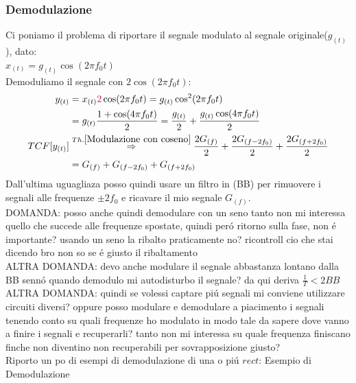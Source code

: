             \subsubsection{Demodulazione}\label{Demodulazione}
            Ci poniamo il problema di riportare il segnale modulato al segnale originale($g_{(t)}$), dato:\\
            $x_{(t)} = g_{(t)} \cos(2\pi f_0t)$\\
            Demoduliamo il segnale con $2\cos(2\pi f_0t)$:
            \begin{align}
                y_{(t)} &= x_{(t)} {\color{purple}2}\cos(2\pi f_0t) = g_{(t)} \cos^2(2\pi f_0t) \nonumber \\
                        &= g_{(t)} \frac{1+ \cos(4\pi f_0t)}{2} = \frac{g_{(t)}}{2} + \frac{g_{(t)}\cos(4\pi f_0t)}{2}\nonumber\\
                TCF[y_{(t)}] &\overset{Th. \ref{Modulazione con coseno}}{\Rightarrow}  \frac{2G_{(f)}}{2} + \frac{2G_{(f-2f_0)}}{2}+ \frac{2G_{(f+2f_0)}}{2} \nonumber \\
                        &= G_{(f)}+G_{(f-2f_0)}+G_{(f+2f_0)}
            \end{align}
            Dall'ultima uguagliaza posso quindi usare un filtro in ({\color{blue}BB}) per rimuovere i segnali alle frequenze $\pm 2f_0$ e ricavare il mio segnale $G_{(f)}$.\\
            DOMANDA: posso anche quindi demodulare con un seno tanto non mi interessa quello che succede alle frequenze spostate,
            quindi peró ritorno sulla fase, non é importante? usando un seno la ribalto praticamente no? ricontroll cio che stai dicendo bro non so 
            se é giusto il ribaltamento \\
            ALTRA DOMANDA: devo anche modulare il segnale abbastanza lontano dalla BB sennó quando demodulo mi autodisturbo il segnale? da qui deriva $\frac{1}{T}<2BB$\\
            ALTRA DOMANDA: quindi se volessi captare piú segnali mi conviene utilizzare circuiti diversi? oppure posso modulare e demodulare a piacimento i segnali tenendo conto 
            su quali frequenze ho modulato in modo tale da sapere dove vanno a finire i segnali e recuperarli? tanto non mi interessa su quale frequenza finiscano finche non diventino 
            non recuperabili per sovrapposizione giusto?\\
            Riporto un po di esempi di demodulazione di una o piú $rect$:
            Esempio di Demodulazione
